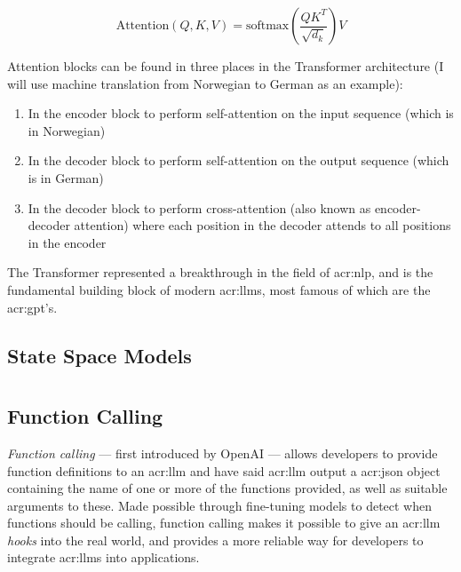 \begin{equation}
    \text{Attention}(Q, K, V) = \text{softmax}\left(\frac{QK^T}{\sqrt{d_k}}\right)V
    \label{eq:attention}
\end{equation}

Attention blocks can be found in three places in the Transformer architecture \citep[5]{vaswaniAttentionAllYou2017} (I will use machine translation from Norwegian to German as an example):

\begin{enumerate}
    \item In the encoder block to perform self-attention on the input sequence (which is in Norwegian)
    \item In the decoder block to perform self-attention on the output sequence (which is in German)
    \item In the decoder block to perform cross-attention (also known as encoder-decoder attention) where each position in the decoder attends to all positions in the encoder
\end{enumerate}

The Transformer represented a breakthrough in the field of \gls{acr:nlp}, and is the fundamental building block of modern \glspl{acr:llm}, most famous of which are the \acrshort{acr:gpt}'s.

\subsection{State Space Models}
\label{subsec:state-space-models}


\section[Large Language Models]{}

\subsection[Function Calling LLMs]{Function Calling }
\label{subsec:function-calling}

\textit{Function calling} --- first introduced by OpenAI \citep{eletiFunctionCallingOther2023} --- allows developers to provide function definitions to an \gls{acr:llm} and have said \gls{acr:llm} output a \acrshort{acr:json} object containing the name of one or more of the functions provided, as well as suitable arguments to these. Made possible through fine-tuning models to detect when functions should be calling, function calling makes it possible to give an \gls{acr:llm} \textit{hooks} into the real world, and provides a more reliable way for developers to integrate \glspl{acr:llm} into applications.

